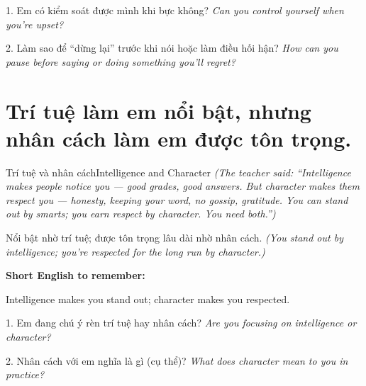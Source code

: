 \begin{tuhocnhanh}
1. Em có kiểm soát được mình khi bực không? \textit{Can you control yourself when you're upset?}

2. Làm sao để ``dừng lại'' trước khi nói hoặc làm điều hối hận? \textit{How can you pause before saying or doing something you'll regret?}
\end{tuhocnhanh}
\ngancach

\section{Trí tuệ làm em nổi bật, nhưng nhân cách làm em được tôn trọng.}
\begin{truyen}{Trí tuệ và nhân cách}{Intelligence and Character}
\textit{(The teacher said: ``Intelligence makes people notice you — good grades, good answers. But character makes them respect you — honesty, keeping your word, no gossip, gratitude. You can stand out by smarts; you earn respect by character. You need both.'')}
\end{truyen}

\begin{baihoc}
Nổi bật nhờ trí tuệ; được tôn trọng lâu dài nhờ nhân cách.
\textit{(You stand out by intelligence; you're respected for the long run by character.)}
\end{baihoc}

\begin{ghinhoanh}
\textbf{Short English to remember:}

Intelligence makes you stand out; character makes you respected.

\end{ghinhoanh}

\begin{tuhocnhanh}
1. Em đang chú ý rèn trí tuệ hay nhân cách? \textit{Are you focusing on intelligence or character?}

2. Nhân cách với em nghĩa là gì (cụ thể)? \textit{What does character mean to you in practice?}
\end{tuhocnhanh}
\ngancach

